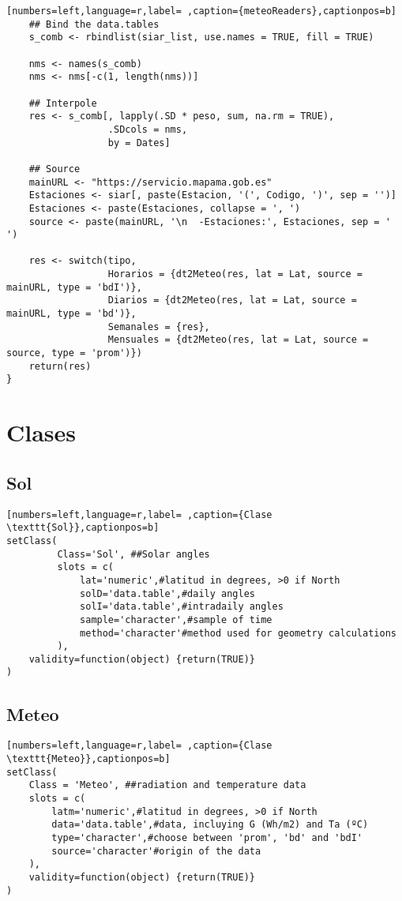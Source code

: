 \begin{lstlisting}[numbers=left,language=r,label= ,caption={meteoReaders},captionpos=b]
    ## Bind the data.tables
    s_comb <- rbindlist(siar_list, use.names = TRUE, fill = TRUE)

    nms <- names(s_comb)
    nms <- nms[-c(1, length(nms))]

    ## Interpole
    res <- s_comb[, lapply(.SD * peso, sum, na.rm = TRUE),
                  .SDcols = nms,
                  by = Dates]

    ## Source
    mainURL <- "https://servicio.mapama.gob.es"
    Estaciones <- siar[, paste(Estacion, '(', Codigo, ')', sep = '')]
    Estaciones <- paste(Estaciones, collapse = ', ')
    source <- paste(mainURL, '\n  -Estaciones:', Estaciones, sep = ' ')

    res <- switch(tipo,
                  Horarios = {dt2Meteo(res, lat = Lat, source = mainURL, type = 'bdI')},
                  Diarios = {dt2Meteo(res, lat = Lat, source = mainURL, type = 'bd')},
                  Semanales = {res},
                  Mensuales = {dt2Meteo(res, lat = Lat, source = source, type = 'prom')})
    return(res)
}
\end{lstlisting}

\section{Clases}
\label{sec:org7251d87}
\subsection{Sol}
\label{sec:orga85e645}
\label{subsec:sol}
\begin{lstlisting}[numbers=left,language=r,label= ,caption={Clase \texttt{Sol}},captionpos=b]
setClass(
         Class='Sol', ##Solar angles
         slots = c(
             lat='numeric',#latitud in degrees, >0 if North
             solD='data.table',#daily angles
             solI='data.table',#intradaily angles
             sample='character',#sample of time
             method='character'#method used for geometry calculations
         ),
    validity=function(object) {return(TRUE)}
)
\end{lstlisting}
\subsection{Meteo}
\label{sec:orgb81703b}
\label{subsec:meteo}
\begin{lstlisting}[numbers=left,language=r,label= ,caption={Clase \texttt{Meteo}},captionpos=b]
setClass(
    Class = 'Meteo', ##radiation and temperature data
    slots = c(
        latm='numeric',#latitud in degrees, >0 if North
        data='data.table',#data, incluying G (Wh/m2) and Ta (ºC)
        type='character',#choose between 'prom', 'bd' and 'bdI'
        source='character'#origin of the data
    ),
    validity=function(object) {return(TRUE)}
)
\end{lstlisting}
